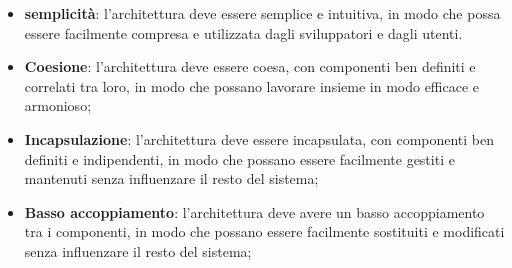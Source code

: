 \begin{itemize}
	\item \textbf{semplicità}: l'architettura deve essere semplice e intuitiva, in modo che possa essere facilmente compresa e utilizzata dagli sviluppatori e dagli utenti.
	\item \textbf{Coesione}: l'architettura deve essere coesa, con componenti ben definiti e correlati tra loro, in modo che possano lavorare insieme in modo efficace e armonioso;
	\item \textbf{Incapsulazione}: l'architettura deve essere incapsulata, con componenti ben definiti e indipendenti, in modo che possano essere facilmente gestiti e mantenuti senza influenzare il resto del sistema;
	\item \textbf{Basso accoppiamento}: l'architettura deve avere un basso accoppiamento tra i componenti, in modo che possano essere facilmente sostituiti e modificati senza influenzare il resto del sistema;
\end{itemize}

